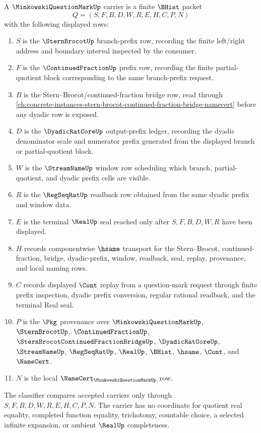 \begin{definition}
\label{def:minkowski-question-mark-carrier}
A $\MinkowskiQuestionMarkUp$ carrier is a finite $\BHist$ packet
$$
Q=(S,F,B,D,W,R,E,H,C,P,N)
$$
with the following displayed rows:
\begin{enumerate}
\item $S$ is the $\SternBrocotUp$ branch-prefix row, recording the finite left/right address and boundary interval inspected by the consumer.
\item $F$ is the $\ContinuedFractionUp$ prefix row, recording the finite partial-quotient block corresponding to the same branch-prefix request.
\item $B$ is the Stern--Brocot/continued-fraction bridge row, read through \autoref{ch:concrete-instances-stern-brocot-continued-fraction-bridge-namecert} before any dyadic row is exposed.
\item $D$ is the $\DyadicRatCoreUp$ output-prefix ledger, recording the dyadic denominator scale and numerator prefix generated from the displayed branch or partial-quotient block.
\item $W$ is the $\StreamNameUp$ window row scheduling which branch, partial-quotient, and dyadic prefix cells are visible.
\item $R$ is the $\RegSeqRatUp$ readback row obtained from the same dyadic prefix and window data.
\item $E$ is the terminal $\RealUp$ seal reached only after $S,F,B,D,W,R$ have been displayed.
\item $H$ records componentwise $\hsame$ transport for the Stern--Brocot, continued-fraction, bridge, dyadic-prefix, window, readback, seal, replay, provenance, and local naming rows.
\item $C$ records displayed $\Cont$ replay from a question-mark request through finite prefix inspection, dyadic prefix conversion, regular rational readback, and the terminal Real seal.
\item $P$ is the $\Pkg$ provenance over $\MinkowskiQuestionMarkUp$, $\SternBrocotUp$, $\ContinuedFractionUp$, $\SternBrocotContinuedFractionBridgeUp$, $\DyadicRatCoreUp$, $\StreamNameUp$, $\RegSeqRatUp$, $\RealUp$, $\BHist$, $\hsame$, $\Cont$, and $\NameCert$.
\item $N$ is the local $\NameCert_{\MinkowskiQuestionMarkUp}$ row.
\end{enumerate}
The classifier compares accepted carriers only through $S,F,B,D,W,R,E,H,C,P,N$. The carrier has no coordinate for quotient real equality, completed function equality, trichotomy, countable choice, a selected infinite expansion, or ambient $\RealUp$ completeness.
\end{definition}


